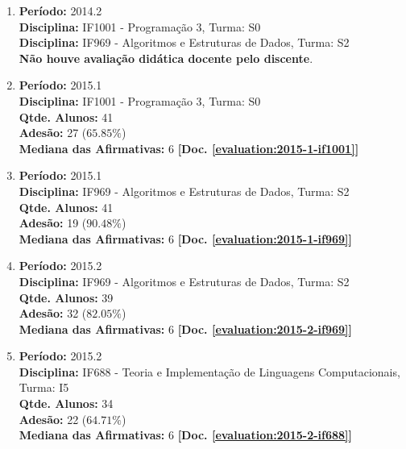 \documentclass[a4paper,oneside,10pt]{article}
\begin{document}

\begin{enumerate}
\renewcommand{\labelenumi}{{\large\bfseries\arabic{enumi}.}}

\item   \textbf{Período:} 2014.2 \\
        \textbf{Disciplina:} IF1001 - Programação 3, Turma: S0\\
        \textbf{Disciplina:} IF969 - Algoritmos e Estruturas de Dados, Turma: S2\\
        \textbf{Não houve avaliação didática docente pelo discente}.

\item   \textbf{Período:} 2015.1 \\
        \textbf{Disciplina:} IF1001 - Programação 3, Turma: S0\\
        \textbf{Qtde. Alunos:} 41\\
        \textbf{Adesão:} 27 ($65.85\%$)\\
        \textbf{Mediana das Afirmativas:} 6 \textbf{[Doc. \ref{evaluation:2015-1-if1001}]}

\item   \textbf{Período:} 2015.1 \\
        \textbf{Disciplina:} IF969 - Algoritmos e Estruturas de Dados, Turma: S2\\
        \textbf{Qtde. Alunos:} 41\\
        \textbf{Adesão:} 19 ($90.48\%$)\\
        \textbf{Mediana das Afirmativas:} 6 \textbf{[Doc. \ref{evaluation:2015-1-if969}]}

\item   \textbf{Período:} 2015.2 \\
        \textbf{Disciplina:} IF969 - Algoritmos e Estruturas de Dados, Turma: S2\\
        \textbf{Qtde. Alunos:} 39\\
        \textbf{Adesão:} 32 ($82.05\%$)\\
        \textbf{Mediana das Afirmativas:} 6 \textbf{[Doc. \ref{evaluation:2015-2-if969}]}

\item   \textbf{Período:} 2015.2 \\
        \textbf{Disciplina:} IF688 - Teoria e Implementação de Linguagens Computacionais, Turma: I5\\
        \textbf{Qtde. Alunos:} 34\\
        \textbf{Adesão:} 22 ($64.71\%$)\\
        \textbf{Mediana das Afirmativas:} 6 \textbf{[Doc. \ref{evaluation:2015-2-if688}]}


\end{enumerate}
\end{document}
